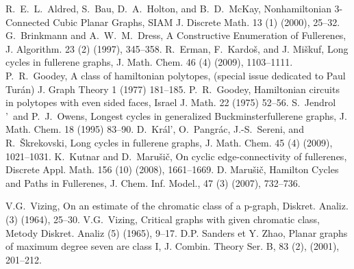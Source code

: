 \documentclass[10pt,a4paper]{article}
\begin{document}
\begin{thebibliography}{99}
 R.~E.~L.~Aldred, S.~Bau, D.~A.~Holton, and B.~D.~McKay,	
Nonhamiltonian 3-Connected Cubic Planar Graphs,
SIAM J. Discrete Math. 13 (1) (2000), 25--32.
 G.~Brinkmann and A.~W.~M.~Dress, A Constructive Enumeration of Fullerenes, J. Algorithm. 23 (2) (1997), 345--358.
 R.~Erman, F.~Kardo\v s, and J. Mi\v skuf, Long cycles in fullerene graphs, J. Math. Chem. 46 (4) (2009), 1103--1111.
 P.~R.~Goodey, A class of hamiltonian polytopes, (special issue dedicated to Paul Tur\'{a}n) J. Graph Theory 1 (1977) 181--185.
 P.~R.~Goodey, Hamiltonian circuits in polytopes with even sided faces, Israel J. Math. 22 (1975) 52--56.
 S.~Jendrol$\!$'~and P.~J.~Owens, {Longest cycles in generalized Buckminsterfullerene graphs}, J. Math. Chem. {18} (1995) 83--90.
 D.~Kr\'al$\!$', O.~Pangr\'ac, J.-S.~Sereni, and R.~\v Skrekovski, Long cycles in fullerene graphs, J. Math. Chem. 45 (4) (2009), 1021--1031.
 K.~Kutnar and D.~Maru\v si\v c, On cyclic edge-connectivity of fullerenes, Discrete Appl. Math. 156 (10) (2008), 1661--1669.
 D. Maru\v si\v c, {Hamilton Cycles and Paths in Fullerenes}, J. Chem. Inf. Model., {47} (3) (2007), 732--736. 

 V.G.~Vizing, On an estimate of the chromatic class of a p-graph, Diskret. Analiz. (3) (1964), 25--30.
 V.G.~Vizing, Critical graphs with given chromatic class, Metody Diskret. Analiz (5) (1965), 9--17.
 D.P. Sanders et Y. Zhao, Planar graphs of maximum degree seven are class I, J. Combin. Theory Ser. B, {83} (2), (2001), 201--212.
\end{thebibliography}
\end{document}
